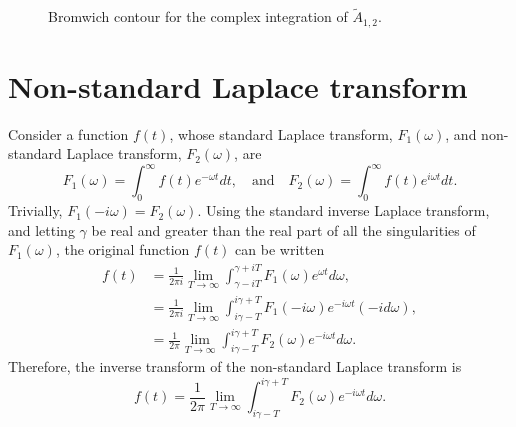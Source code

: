 \documentclass[12pt]{article}
\begin{document}
\begin{figure}
{ 
	}
	\caption{Bromwich contour for the complex integration of $\tilde{A}_{1,2}$.}
	\label{fig: brom cont incomp}
\end{figure}



\appendix

\section{Non-standard Laplace transform}\label{app: laplace trans}
Consider a function $f(t)$, whose standard Laplace transform, $F_1(\omega)$, and non-standard Laplace transform, $F_2(\omega)$, are
\begin{equation}
F_1(\omega) = \int_0^\infty f(t) e^{-\omega t} dt,
\quad \text{and} \quad
F_2(\omega) = \int_0^\infty f(t) e^{i\omega t} dt.
\end{equation}
Trivially, $F_1(-i\omega) = F_2(\omega)$. Using the standard inverse Laplace transform, and letting $\gamma$ be real and greater than the real part of all the singularities of $F_1(\omega)$, the original function $f(t)$ can be written
\begin{align}
f(t) & = \frac{1}{2\pi i} \lim_{T\to\infty} \int_{\gamma - iT}^{\gamma + iT} F_1(\omega)e^{\omega t} d\omega, \\
& = \frac{1}{2\pi i} \lim_{T\to\infty} \int_{i\gamma - T}^{i\gamma + T} F_1(-i\omega)e^{-i\omega t} (-id\omega), \\
& = \frac{1}{2\pi} \lim_{T\to\infty} \int_{i\gamma - T}^{i\gamma + T} F_2(\omega)e^{-i\omega t} d\omega.
\end{align}
Therefore, the inverse transform of the non-standard Laplace transform is
\begin{equation}
f(t) = \frac{1}{2\pi} \lim_{T\to\infty} \int_{i\gamma - T}^{i\gamma + T} F_2(\omega)e^{-i\omega t} d\omega.
\end{equation}
\end{document}
